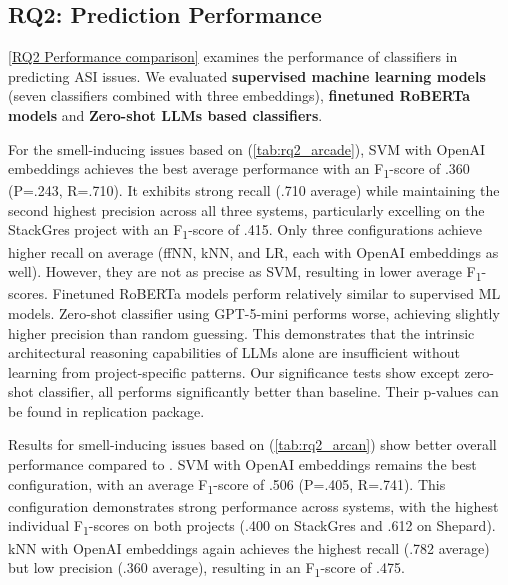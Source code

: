 \subsection{RQ2: Prediction Performance}

\ref{RQ2 Performance comparison} examines the performance of classifiers in predicting \acl{ASI} issues.
We evaluated \textbf{supervised machine learning models} (seven classifiers combined with three embeddings), \textbf{finetuned RoBERTa models} and \textbf{Zero-shot LLMs based classifiers}.

For the smell-inducing issues based on \ARCADE (\autoref{tab:rq2_arcade}), \ac{SVM} with OpenAI embeddings achieves the best average performance with an F\textsubscript{1}-score of .360 (P=.243, R=.710).
It exhibits strong recall (.710 average) while maintaining the second highest precision across all three systems, particularly excelling on the StackGres project with an F\textsubscript{1}-score of .415.
Only three configurations achieve higher recall on average (\ac{ffNN}, \ac{kNN}, and \ac{LR}, each with OpenAI embeddings as well).
However, they are not as precise as \ac{SVM}, resulting in lower average F\textsubscript{1}-scores.
Finetuned RoBERTa models perform relatively similar to supervised ML models. 
Zero-shot classifier using GPT-5-mini performs worse, achieving slightly higher precision than random guessing. 
This demonstrates that the intrinsic architectural reasoning capabilities of \acp{LLM} alone are insufficient without learning from project-specific patterns.
Our significance tests show except zero-shot classifier, all performs significantly better than baseline.
Their p-values can be found in replication package\cite{replication}.

Results for smell-inducing issues based on \Arcan (\autoref{tab:rq2_arcan}) show better overall performance compared to \ARCADE.
\ac{SVM} with OpenAI embeddings remains the best configuration, with an average F\textsubscript{1}-score of .506 (P=.405, R=.741).
This configuration demonstrates strong performance across systems, with the highest individual F\textsubscript{1}-scores on both projects (.400 on StackGres and .612 on Shepard).
\ac{kNN} with OpenAI embeddings again achieves the highest recall (.782 average) but low precision (.360 average), resulting in an F\textsubscript{1}-score of .475.

